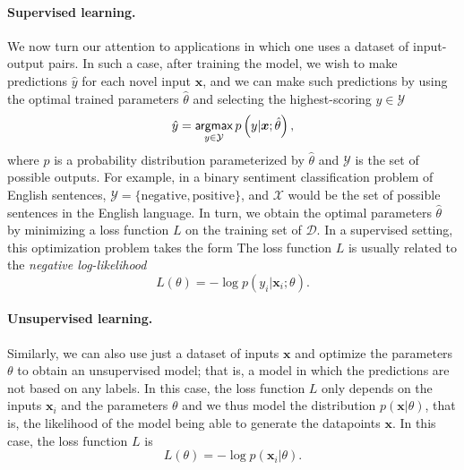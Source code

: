 \paragraph*{Supervised learning.} We now turn our attention to applications
in which one uses a dataset of input-output pairs. In such a case, 
after training the model, we
wish to make predictions $\hat{y}$ for each novel input $\bm{x}$, and we can
make such predictions by using the optimal trained parameters $\hat{\theta}$
and selecting the highest-scoring $y\in\mathcal{Y}$
%
\begin{equation}
    \hat{y}=\operatorname*{\mathsf{argmax}}_{y\in\mathcal{Y}}p\left(y|\bm{x};\hat{\theta}\right),
\end{equation}
%
where $p$ is a probability distribution parameterized by
$\hat{\theta}$ and $\mathcal{Y}$ is the set of possible outputs. For
example, in a binary sentiment classification problem of English
sentences, $\mathcal{Y}=\{\text{negative},\text{positive}\}$, and
$\mathcal{X}$ would be the set of possible sentences in the English
language. In turn, we obtain the optimal parameters $\hat{\theta}$ by
minimizing a loss function $L$ on the training set of $\mathcal{D}$.
In a supervised setting, this optimization problem takes the form
The loss function $L$ is usually related to the
\textit{negative log-likelihood}
%
\begin{equation}
    L\left(\theta\right)=-\log p\left(y_i|\bm{x}_i;\theta\right).
\end{equation}

\paragraph*{Unsupervised learning.} Similarly, we can also use just a
dataset of inputs $\bm{x}$ and optimize the parameters $\theta$ to
obtain an unsupervised model; that is, a model in which the predictions are
not based on any labels. In this case, the loss function $L$ only
depends on the inputs $\bm{x}_i$ and the parameters $\theta$
and we thus model the distribution $p(\bm{x}|\theta)$, that is,
the likelihood of the model being able to generate the datapoints $\bm{x}$.
In this case, the loss function $L$ is
%
\begin{equation}
    L\left(\theta\right)=-\log p\left(\bm{x}_i|\theta\right).
\end{equation}

